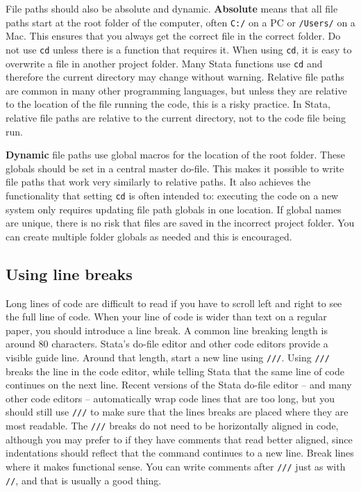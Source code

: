 File paths should also be absolute and dynamic.
\textbf{Absolute} means that all
file paths start at the root folder of the computer,
often \texttt{C:/} on a PC or \texttt{/Users/} on a Mac.
This ensures that you always get the correct file in the correct folder.
Do not use \texttt{cd} unless there is a function that requires it.
When using \texttt{cd}, it is easy to overwrite a file in another project folder.
Many Stata functions use \texttt{cd} and therefore the current directory may change without warning.
Relative file paths are common in many other programming languages,
but unless they are relative to the location of the file running the code,
this is a risky practice.
In Stata, relative file paths are relative to the current directory,
not to the code file being run.

\textbf{Dynamic} file paths use global macros for the location of the root folder.
These globals should be set in a central master do-file.
This makes it possible to write file paths that work very similarly to relative paths.
It also achieves the functionality that setting \texttt{cd} is often intended to:
executing the code on a new system only requires updating file path globals in one location.
If global names are unique, there is no risk that files are saved in the incorrect project folder.
You can create multiple folder globals as needed and this is encouraged.


\subsection*{Using line breaks}

Long lines of code are difficult to read if you have to scroll left and right to see the full line of code.
When your line of code is wider than text on a regular paper, you should introduce a line break.
A common line breaking length is around 80 characters.
Stata's do-file editor and other code editors provide a visible guide line.
Around that length, start a new line using \texttt{///}.
Using \texttt{///} breaks the line in the code editor,
while telling Stata that the same line of code continues on the next line.
Recent versions of the Stata do-file editor --
and many other code editors --
automatically wrap code lines that are too long,
but you should still use \texttt{///}
to make sure that the lines breaks are placed
where they are most readable.
The \texttt{///} breaks do not need to be horizontally aligned in code,
although you may prefer to if they have comments that read better aligned,
since indentations should reflect that the command continues to a new line.
Break lines where it makes functional sense.
You can write comments after \texttt{///} just as with \texttt{//}, and that is usually a good thing.

